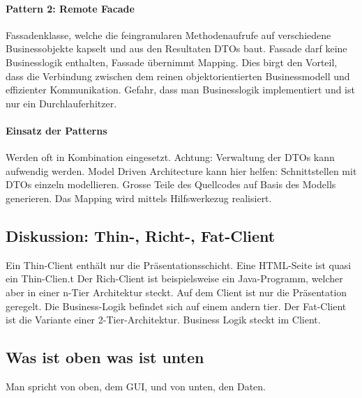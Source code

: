 \paragraph{Pattern 2: Remote Facade} Fassadenklasse, welche die feingranularen Methodenaufrufe auf verschiedene Businessobjekte kapselt und aus den Resultaten DTOs baut. Fassade darf keine Businesslogik enthalten, Fassade übernimmt Mapping. Dies birgt den Vorteil, dass die Verbindung zwischen dem reinen objektorientierten Businessmodell und effizienter Kommunikation. Gefahr, dass man Businesslogik implementiert und ist nur ein Durchlauferhitzer.

\paragraph{Einsatz der Patterns}
Werden oft in Kombination eingesetzt. Achtung: Verwaltung der DTOs kann aufwendig werden. Model Driven Architecture kann hier helfen: Schnittstellen mit DTOs einzeln modellieren. Grosse Teile des Quellcodes auf Basis des Modells generieren. Das Mapping wird mittels Hilfswerkezug realisiert.

\subsection{Diskussion: Thin-, Richt-, Fat-Client}
Ein Thin-Client enthält nur die Präsentationsschicht. Eine HTML-Seite ist quasi ein Thin-Clien.t
Der Rich-Client ist beispielsweise ein Java-Programm, welcher aber in einer n-Tier Architektur steckt. Auf dem Client ist nur die Präsentation geregelt. Die Business-Logik befindet sich auf einem andern tier. Der Fat-Client ist die Variante einer 2-Tier-Architektur. Business Logik steckt im Client.

\subsection{Was ist oben was ist unten}
Man spricht von oben, dem GUI, und von unten, den Daten.
